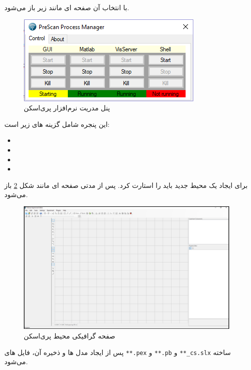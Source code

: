 با انتخاب آن صفحه ای مانند زیر باز می‌شود.

\begin{figure}[h]
	\centering
	\includegraphics[width=0.5\linewidth]{Figures/Prescan-panel}
	\caption{پنل مدریت نرم‌افزار پری‌اسکن}
	\label{fig:prescan-panel}
\end{figure}

این پنجره شامل گزینه های زیر است:
\begin{multicols}{2}
	\begin{itemize}
		\item {}
		\item {}
		\item {}
		\item {}
	\end{itemize}
\end{multicols}

برای ایجاد یک محیط جدید باید  را استارت کرد. پس از مدتی صفحه ای مانند شکل 
\ref{fig:prescan-gui}
باز می‌شود. 





\begin{figure}
	\centering
	\includegraphics[width=0.7\linewidth]{Figures/Prescan-GUI}
	\caption{صفحه گرافیکی محیط پری‌اسکن}
	\label{fig:prescan-gui}
\end{figure}



پس از ایجاد مدل ها و ذخیره آن، فایل های \texttt{**.pex} و \texttt{**.pb} و \texttt{**\_cs.slx} ساخته می‌شود.

